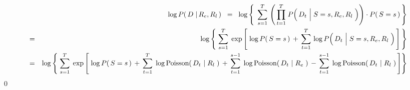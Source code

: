 \begin{eqnarray*}
&&
	\log P\!\left(\,D \;\vert\, R_{e},R_{l}\,\right)
\;\; = \;\;
	\log\left\{\;\,
	\overset{T}{\underset{s=1}{\sum}}\,
		\left(\,
			\overset{T}{\underset{t=1}{\prod}}\;
			P\!\left(\,D_{t} \,\left\vert\; S\overset{{\color{white}1}}{=}s,R_{e},R_{l}\right.\,\right)
			\right)
		\cdot
		P\!\left(\,S=s\,\right)
	\,\right\}
\\
& = &
	\log\left\{\;
	\overset{T}{\underset{s=1}{\sum}}\;
	\exp\left[\;
		\log P\!\left(\,S=s\,\right)
		\, + \,
		\overset{T}{\underset{t=1}{\sum}}\,
		\log P\!\left(\,D_{t} \,\left\vert\; S\overset{{\color{white}1}}{=}s,R_{e},R_{l}\right.\,\right)
		\,\right]
	\,\right\}
\\
&=&
	\log\left\{\;
	\overset{T}{\underset{s=1}{\sum}}\;
	\exp\left[\;
			\log P\!\left(\,S=s\,\right)
			\,+\,
			\overset{T}{\underset{t=1}{\sum}}\;
			\log\textnormal{Poisson}\!\left(\,D_{t} \,\left\vert\; R_{l}\right.\,\right)
			\,+\,
			\overset{s-1}{\underset{t=1}{\sum}}\;
			\log\textnormal{Poisson}\!\left(\,D_{t} \,\left\vert\; R_{e}\right.\,\right)
			\,-\,
			\overset{s-1}{\underset{t=1}{\sum}}\;
			\log\textnormal{Poisson}\!\left(\,D_{t} \,\left\vert\; R_{l}\right.\,\right)
		\,\right]
	\right\}
\end{eqnarray*}
\qed


